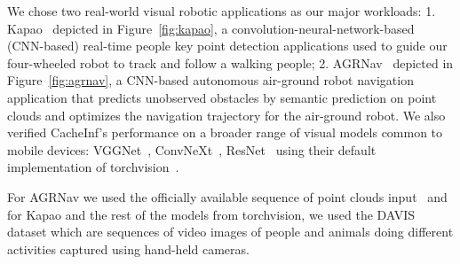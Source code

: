 We chose two real-world visual robotic applications as our major workloads: 1. Kapao~\cite{kapao} depicted in Figure~\ref{fig:kapao}, a convolution-neural-network-based (CNN-based) real-time people key point detection applications used to guide our four-wheeled robot to track and follow a walking people;
2. AGRNav~\cite{agrnav} depicted in Figure~\ref{fig:agrnav}, a CNN-based autonomous air-ground robot navigation application that predicts unobserved obstacles by semantic prediction on point clouds and optimizes the navigation trajectory for the air-ground robot.
We also verified CacheInf's performance on a broader range of visual models common to mobile devices: VGGNet~\cite{simonyan2015deep}, ConvNeXt~\cite{woo2023convnext}, ResNet~\cite{targ2016resnet} using their default implementation of torchvision~\cite{noauthor_torchvision_nodate}. 

For AGRNav we used the officially available sequence of point clouds input~\cite{agrnav} and for Kapao and the rest of the models from torchvision, we used the DAVIS~\cite{Perazzi2016} dataset which are sequences of video images of people and animals doing different activities captured using hand-held cameras.

